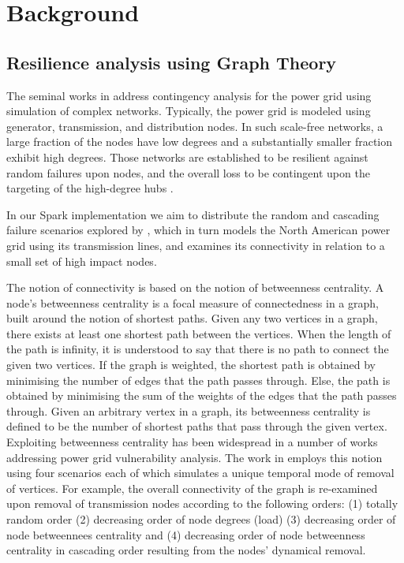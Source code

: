 \section{Background}
\label{background}

\subsection{Resilience analysis using Graph Theory}
\label{resilience}

The seminal works in \cite{2000Natur.406..378A,DaqingAl14} address contingency analysis for the power grid using simulation of complex networks. Typically, the power grid is modeled using generator, transmission, and distribution nodes. In such scale-free networks, a large fraction of the nodes have low degrees and a substantially smaller fraction exhibit high degrees. Those networks are established to be resilient against random failures upon nodes, and the overall loss to be contingent upon the targeting of the high-degree hubs \cite{AlbertAl00, CohenAl00, CohenAl01, CallawayAl00}. 

In our Spark implementation we aim to distribute the random and cascading failure scenarios explored by \cite{2000Natur.406..378A}, which in turn models the North American power grid using its transmission lines, and examines its connectivity in relation to a small set of high impact nodes. 

The notion of connectivity is based on the notion of betweenness centrality. A node's betweenness centrality is a focal measure of connectedness in a graph, built around the notion of shortest paths. Given any two vertices in a graph, there exists at least one shortest path between the vertices. When the length of the path is infinity, it is understood to say that there is no path to connect the given two vertices. If the graph is weighted, the shortest path is obtained by minimising the number of edges that the path passes through. Else, the path is obtained by minimising the sum of the weights of the edges that the path passes through. Given an arbitrary vertex in a graph, its betweenness centrality is defined to be the number of shortest paths that pass through the given vertex. Exploiting betweenness centrality has been widespread in a number of works addressing power grid vulnerability analysis. The work in \cite{2000Natur.406..378A} employs this notion using four scenarios each of which simulates a unique temporal mode of removal of vertices. For example, the overall connectivity of the graph is re-examined upon removal of transmission nodes according to the following orders: (1) totally random order (2) decreasing order of node degrees (load) (3) decreasing order of node betweennees centrality and (4) decreasing order of node betweenness centrality in cascading order resulting from the nodes' dynamical removal. 

